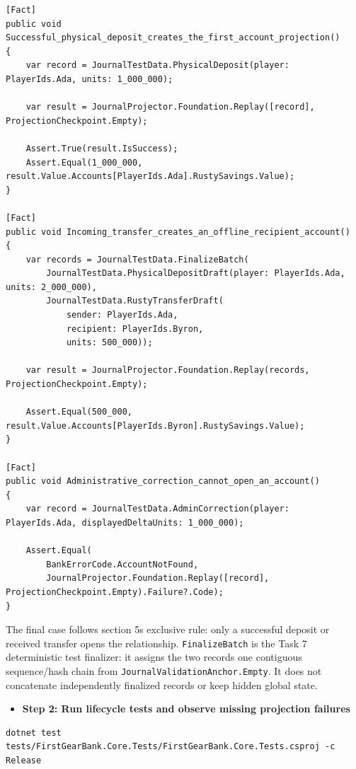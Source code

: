 \documentclass[
  10pt,
  letterpaper,
]{article}
\newcommand{\passthrough}[1]{#1}
\providecommand{\tightlist}{%
  \setlength{\itemsep}{0pt}\setlength{\parskip}{0pt}}
\begin{document}
\begin{lstlisting}
[Fact]
public void Successful_physical_deposit_creates_the_first_account_projection()
{
    var record = JournalTestData.PhysicalDeposit(player: PlayerIds.Ada, units: 1_000_000);

    var result = JournalProjector.Foundation.Replay([record], ProjectionCheckpoint.Empty);

    Assert.True(result.IsSuccess);
    Assert.Equal(1_000_000, result.Value.Accounts[PlayerIds.Ada].RustySavings.Value);
}

[Fact]
public void Incoming_transfer_creates_an_offline_recipient_account()
{
    var records = JournalTestData.FinalizeBatch(
        JournalTestData.PhysicalDepositDraft(player: PlayerIds.Ada, units: 2_000_000),
        JournalTestData.RustyTransferDraft(
            sender: PlayerIds.Ada,
            recipient: PlayerIds.Byron,
            units: 500_000));

    var result = JournalProjector.Foundation.Replay(records, ProjectionCheckpoint.Empty);

    Assert.Equal(500_000, result.Value.Accounts[PlayerIds.Byron].RustySavings.Value);
}

[Fact]
public void Administrative_correction_cannot_open_an_account()
{
    var record = JournalTestData.AdminCorrection(player: PlayerIds.Ada, displayedDeltaUnits: 1_000_000);

    Assert.Equal(
        BankErrorCode.AccountNotFound,
        JournalProjector.Foundation.Replay([record], ProjectionCheckpoint.Empty).Failure?.Code);
}
\end{lstlisting}

The final case follows section 5\textquotesingle s exclusive rule: only
a successful deposit or received transfer opens the relationship.
\passthrough{\lstinline!FinalizeBatch!} is the Task 7 deterministic test
finalizer: it assigns the two records one contiguous sequence/hash chain
from \texttt{JournalValidationAnchor.}\allowbreak{}\texttt{Empty}. It
does not concatenate independently finalized records or keep hidden
global state.

\begin{itemize}
\tightlist
\item[$\square$]
  \textbf{Step 2: Run lifecycle tests and observe missing projection
  failures}
\end{itemize}

\begin{lstlisting}
dotnet test tests/FirstGearBank.Core.Tests/FirstGearBank.Core.Tests.csproj -c Release
\end{lstlisting}
\end{document}
